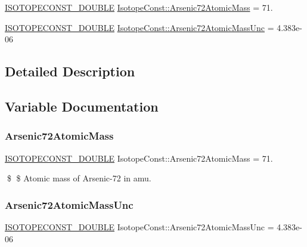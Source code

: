 \begin{DoxyCompactItemize}
\item 
\mbox{\hyperlink{group___isotope_const-_macros_ga8f45a7272ce02c0b4c65c44636ed719a}{I\+S\+O\+T\+O\+P\+E\+C\+O\+N\+S\+T\+\_\+\+D\+O\+U\+B\+LE}} \mbox{\hyperlink{group___isotope_const-_arsenic-_as72_ga135dd883383dc9d80ba30fc6be822b48}{Isotope\+Const\+::\+Arsenic72\+Atomic\+Mass}} = 71.
\item 
\mbox{\hyperlink{group___isotope_const-_macros_ga8f45a7272ce02c0b4c65c44636ed719a}{I\+S\+O\+T\+O\+P\+E\+C\+O\+N\+S\+T\+\_\+\+D\+O\+U\+B\+LE}} \mbox{\hyperlink{group___isotope_const-_arsenic-_as72_ga2dc26262d9ae8edb12c6b76036e2c35c}{Isotope\+Const\+::\+Arsenic72\+Atomic\+Mass\+Unc}} = 4.\+383e-\/06
\end{DoxyCompactItemize}


\subsection{Detailed Description}


\subsection{Variable Documentation}
\mbox{\label{group___isotope_const-_arsenic-_as72_ga135dd883383dc9d80ba30fc6be822b48}} 
\subsubsection{\texorpdfstring{Arsenic72\+Atomic\+Mass}{Arsenic72AtomicMass}}
{\footnotesize\ttfamily \mbox{\hyperlink{group___isotope_const-_macros_ga8f45a7272ce02c0b4c65c44636ed719a}{I\+S\+O\+T\+O\+P\+E\+C\+O\+N\+S\+T\+\_\+\+D\+O\+U\+B\+LE}} Isotope\+Const\+::\+Arsenic72\+Atomic\+Mass = 71.}

\$ \$ Atomic mass of Arsenic-\/72 in amu. \mbox{\label{group___isotope_const-_arsenic-_as72_ga2dc26262d9ae8edb12c6b76036e2c35c}} 
\subsubsection{\texorpdfstring{Arsenic72\+Atomic\+Mass\+Unc}{Arsenic72AtomicMassUnc}}
{\footnotesize\ttfamily \mbox{\hyperlink{group___isotope_const-_macros_ga8f45a7272ce02c0b4c65c44636ed719a}{I\+S\+O\+T\+O\+P\+E\+C\+O\+N\+S\+T\+\_\+\+D\+O\+U\+B\+LE}} Isotope\+Const\+::\+Arsenic72\+Atomic\+Mass\+Unc = 4.\+383e-\/06}

